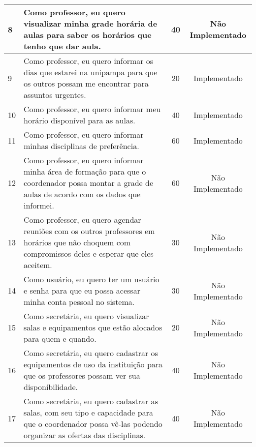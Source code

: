 \begin{landscape}
\begin{longtable}{|p{0.5in}|p{6in}|c|c|}
		\hline \rowcolor{cNaoImplementado}
		         8 & Como professor, eu quero visualizar minha grade horária de aulas para saber os horários que tenho que dar aula. &         40 & Não Implementado \\
		
		\hline \rowcolor{cImplementado}
		         9 & Como professor, eu quero informar os dias que estarei na unipampa para que os outros possam me encontrar para assuntos urgentes.  &         20 & Implementado \\
		
		\hline	\rowcolor{cImplementado}
		        10 & Como professor, eu quero informar meu horário disponível para as aulas. &         40 & Implementado \\
		
		\hline	\rowcolor{cImplementado}
				11 & Como professor, eu quero informar minhas disciplinas de preferência. & 			60 & Implementado \\	
		
		\hline	\rowcolor{cNaoImplementado}
				12 & Como professor, eu quero informar minha área de formação para que o coordenador possa montar a grade de aulas de acordo com os dados que informei. & 60 & Não Implementado \\
		
		\hline	\rowcolor{cNaoImplementado}
		        13 & Como professor, eu quero agendar reuniões com os outros professores em horários que não choquem com compromissos deles e esperar que eles aceitem.  &         30 & Não Implementado \\
		
		\hline \rowcolor{cUserSprint}
		        14 & Como usuário, eu quero ter um usuário e senha para que eu possa acessar minha conta pessoal no sistema. &         30 & Não Implementado \\
		
		\hline \rowcolor{cNaoImplementado}
		        15 & Como secretária, eu quero visualizar salas e equipamentos que estão alocados para quem e quando.  &         20 & Não Implementado \\
		
		\hline \rowcolor{cNaoImplementado}
		        16 & Como secretária, eu quero cadastrar os equipamentos de uso da instituição para que os professores possam ver sua disponibilidade.  &         40 & Não Implementado \\
		
		\hline \rowcolor{cNaoImplementado}
		        17 & Como secretária, eu quero cadastrar as salas, com seu tipo e capacidade para que o coordenador possa vê-las podendo organizar as ofertas das disciplinas. &         40 & Não Implementado \\
		

\end{longtable}
\end{landscape}
